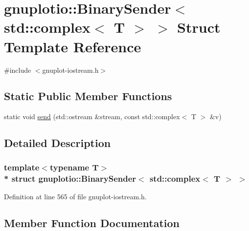 \hypertarget{structgnuplotio_1_1_binary_sender_3_01std_1_1complex_3_01_t_01_4_01_4}{}\section{gnuplotio\+:\+:Binary\+Sender$<$ std\+:\+:complex$<$ T $>$ $>$ Struct Template Reference}
\label{structgnuplotio_1_1_binary_sender_3_01std_1_1complex_3_01_t_01_4_01_4}


{\ttfamily \#include $<$gnuplot-\/iostream.\+h$>$}

\subsection*{Static Public Member Functions}
\begin{DoxyCompactItemize}
\item 
static void \hyperlink{structgnuplotio_1_1_binary_sender_3_01std_1_1complex_3_01_t_01_4_01_4_a759de700a1cd68000830a4b15a6fec49}{send} (std\+::ostream \&stream, const std\+::complex$<$ T $>$ \&v)
\end{DoxyCompactItemize}


\subsection{Detailed Description}
\subsubsection*{template$<$typename T$>$\\*
struct gnuplotio\+::\+Binary\+Sender$<$ std\+::complex$<$ T $>$ $>$}



Definition at line 565 of file gnuplot-\/iostream.\+h.



\subsection{Member Function Documentation}
